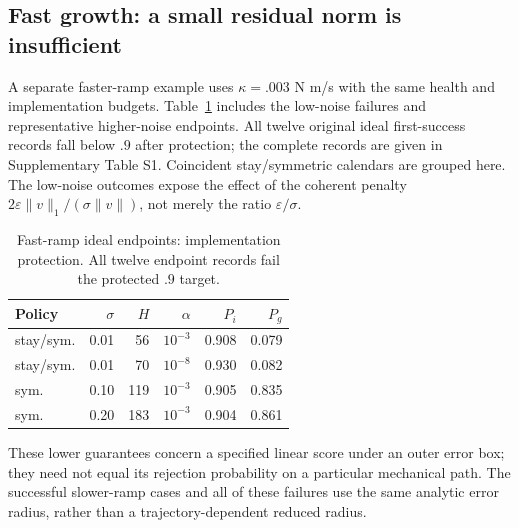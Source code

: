 \subsection{Fast growth: a small residual norm is insufficient}\label{sec:full_disclosure}
A separate faster-ramp example uses $\kappa=.003$ N m/s with the same health and implementation budgets. Table~\ref{tab:guard} includes the low-noise failures and representative higher-noise endpoints. All twelve original ideal first-success records fall below $.9$ after protection; the complete records are given in Supplementary Table S1. Coincident stay/symmetric calendars are grouped here. The low-noise outcomes expose the effect of the coherent penalty $2\varepsilon\|v\|_1/(\sigma\|v\|)$, not merely the ratio $\varepsilon/\sigma$.
\begin{table}[t]\centering\small
\caption{Fast-ramp ideal endpoints: implementation protection. All twelve endpoint records fail the protected $.9$ target.}\label{tab:guard}
\setlength{\tabcolsep}{4pt}
\begin{tabular}{lrrrrr}\toprule
Policy&$\sigma$&$H$&$\alpha$&$P_i$&$P_g$\\\midrule
stay/sym.&0.01&56&$10^{-3}$&0.908&0.079\\
stay/sym.&0.01&70&$10^{-8}$&0.930&0.082\\
sym.&0.10&119&$10^{-3}$&0.905&0.835\\
sym.&0.20&183&$10^{-3}$&0.904&0.861\\
\bottomrule\end{tabular}
\end{table}
These lower guarantees concern a specified linear score under an outer error box; they need not equal its rejection probability on a particular mechanical path. The successful slower-ramp cases and all of these failures use the same analytic error radius, rather than a trajectory-dependent reduced radius.

